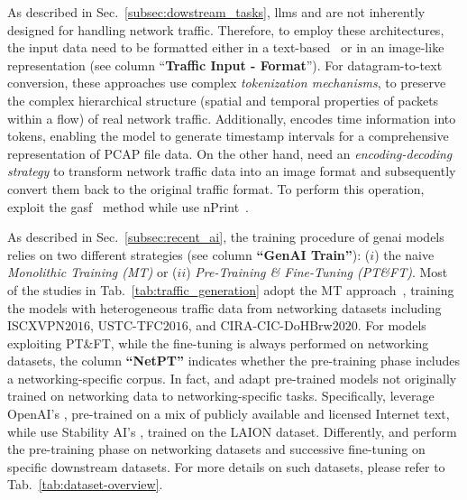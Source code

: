 As described in Sec.~\ref{subsec:dowstream_tasks},
\glspl{llm} and  are not inherently designed for handling network traffic. 
Therefore, to employ these architectures, the input data need to be formatted either in a text-based~\cite{bikmukhamedov2021, meng2023netgpt, Kholgh2023PACGPT, wang2024lens, qu2024trafficgpt, chu2024mamba, zhang2024netdiff,wolf2024} or in an image-like~\cite{sivaroopan2023netdiffus, jiang2024netdiffusion} representation (see column ``\textbf{Traffic Input - Format}'').
%
For datagram-to-text conversion, these approaches use complex \emph{tokenization mechanisms},
to preserve the complex hierarchical structure (\ie spatial and temporal properties of packets within a flow) of real network traffic.
Additionally, \citet{qu2024trafficgpt} encodes time information into tokens, enabling the model to generate timestamp intervals for a comprehensive representation of PCAP file data.
On the other hand,  need an \emph{encoding-decoding strategy} to transform network traffic data into an image format and subsequently convert them back to the original traffic format. 
%
To perform this operation, \citet{sivaroopan2023netdiffus} exploit the \gls{gasf}~\cite{wang2015imaging} method while \citet{jiang2024netdiffusion} use nPrint~\cite{holland2021new}.


%
As described in Sec.~\ref{subsec:recent_ai}, the training procedure of \gls{genai} models relies on two different strategies (see column \textbf{``GenAI Train''}): 
($i$) the naive \emph{Monolithic Training (MT)} or ($ii$) \emph{Pre-Training \& Fine-Tuning (PT\&FT)}.
Most of the studies in Tab.~\ref{tab:traffic_generation} adopt the MT approach~\cite{bikmukhamedov2021, sivaroopan2023netdiffus, qu2024trafficgpt, chu2024mamba, zhang2024netdiff, li2024lightweight, wolf2024}, training the models with heterogeneous traffic data from networking datasets including ISCXVPN$2016$, USTC-TFC$2016$, and CIRA-CIC-DoHBrw$2020$. 
For models exploiting PT\&FT, while the fine-tuning is always performed on networking datasets, the column \textbf{``NetPT''} 
indicates whether the pre-training phase includes a networking-specific corpus. 
In fact, \citet{Kholgh2023PACGPT} and \citet{jiang2024netdiffusion} adapt pre-trained models not originally trained on networking data to networking-specific tasks.
Specifically, \citet{Kholgh2023PACGPT} leverage OpenAI's , pre-trained on a mix of publicly available and licensed Internet text, while \citet{jiang2024netdiffusion} use Stability AI's , trained on the LAION dataset.
Differently, \citet{meng2023netgpt} and \citet{wang2024lens} perform the pre-training phase on networking datasets and successive fine-tuning on specific downstream datasets.
For more details on such datasets, please refer to Tab.~\ref{tab:dataset-overview}.

